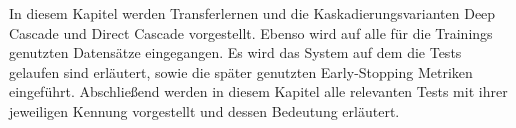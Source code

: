 In diesem Kapitel werden Transferlernen und die Kaskadierungsvarianten Deep Cascade und Direct Cascade vorgestellt. 
Ebenso wird auf alle für die Trainings genutzten Datensätze eingegangen. 
Es wird das System auf dem die Tests gelaufen sind erläutert, sowie die später genutzten Early-Stopping Metriken eingeführt. 
Abschließend werden in diesem Kapitel alle relevanten Tests mit ihrer jeweiligen Kennung vorgestellt und dessen Bedeutung erläutert. 
